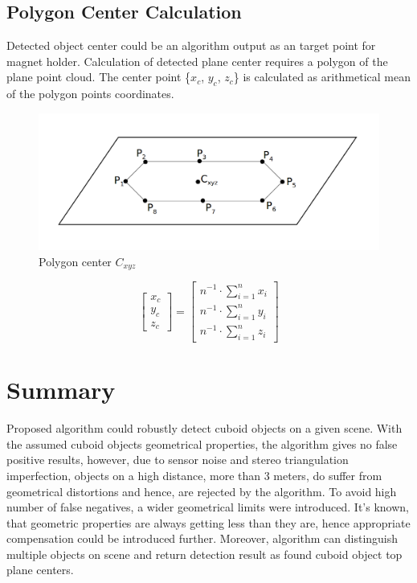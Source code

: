 \documentclass{ctuthesis}
\begin{document}
\subsection{Polygon Center Calculation}
Detected object center could be an algorithm output as an target point for magnet holder. Calculation of detected plane center requires a polygon of the plane point cloud. The center point \{$x_c$, $y_c$, $z_c$\} is calculated as arithmetical mean of the polygon points coordinates.

\begin{figure}[htbp]
    \centering
    \includegraphics[width=\textwidth]{poly_center.png}
    \caption{Polygon center $C_{xyz}$}
    \label{fig:poly_ctr}
\end{figure}

\[\begin{bmatrix}
x_c\\
y_c\\
z_c
\end{bmatrix} = \begin{bmatrix}
n^{-1} \cdot \sum_{i=1}^{n} x_i\\
n^{-1} \cdot \sum_{i=1}^{n} y_i\\
n^{-1} \cdot \sum_{i=1}^{n} z_i
\end{bmatrix} \]



\section{Summary}
Proposed algorithm could robustly detect cuboid objects on a given scene. With the assumed cuboid objects geometrical properties, the algorithm gives no false positive results, however, due to sensor noise and stereo triangulation imperfection, objects on a high distance, more than 3 meters, do suffer from geometrical distortions and hence, are rejected by the algorithm. To avoid high number of false negatives, a wider geometrical limits were introduced. It's known, that geometric properties are always getting less than they are, hence appropriate compensation could be introduced further. Moreover, algorithm can distinguish multiple objects on scene and return detection result as found cuboid object top plane centers.
\end{document}
